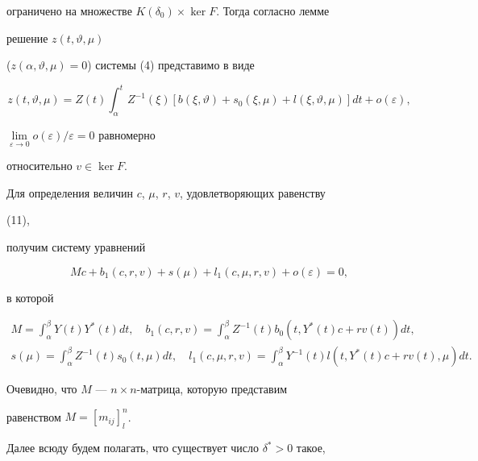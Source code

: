 ограничено на множестве $K(\delta_0)\times\ker F$. Тогда согласно лемме 


решение $z(t,\vartheta,\mu)$ 


($z(\alpha,\vartheta,\mu)=0$) системы (4) представимо в виде 


\begin{equation} 


z(t,\vartheta,\mu)=Z(t)\int^t_\alpha Z^{-1}(\xi) 


[b(\xi,\vartheta)+s_0(\xi,\mu)+ 


l(\xi,\vartheta,\mu)]dt+o(\varepsilon), 


\end{equation} 


$\lim\limits_{\varepsilon\to0}o(\varepsilon)/\varepsilon=0$ равномерно 


относительно $v\in\ker F$. 


Для определения величин $c$, $\mu$, $r$, $v$, удовлетворяющих равенству 


(11), 


получим систему уравнений 


\begin{equation} 


M c+b_1(c,r,v)+s(\mu)+l_1(c,\mu,r,v)+o(\varepsilon)=0, 


\end{equation} 


в которой 


\begin{gather*} 


M=\int^\beta_\alpha Y(t)Y^*(t)dt,\quad 


b_1(c,r,v)=\int^\beta_\alpha Z^{-1}(t)b_0(t,Y^*(t)c+ 


r v(t))dt, \\ 


% 


s(\mu)=\int^\beta_\alpha Z^{-1}(t)s_0(t,\mu)dt,\quad 


l_1(c,\mu,r,v)=\int^\beta_\alpha Y^{-1}(t) 


l(t,Y^*(t)c+r v(t),\mu)dt. 


\end{gather*} 


Очевидно, что $M$ --- $n\times n$-матрица, которую представим 


равенством $M=[m_{ij}]^n_l$. 


 


Далее всюду будем полагать, что существует число $\delta^*>0$ такое, 


